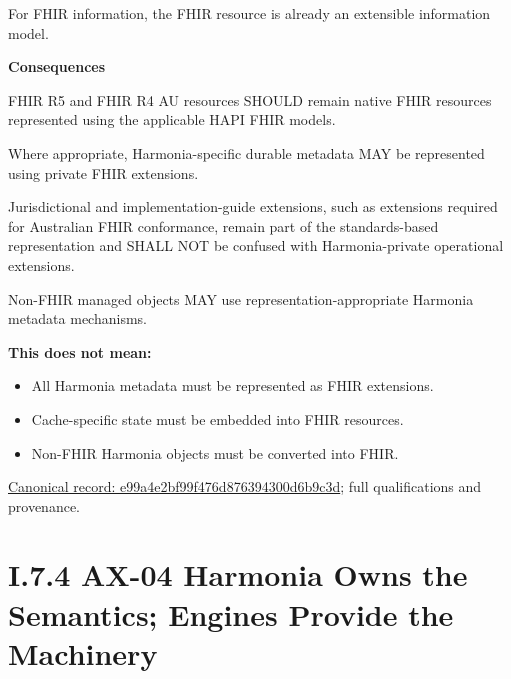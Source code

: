 For FHIR information, the FHIR resource is already an extensible
information model.



\par\medskip\textbf{Consequences}\par


FHIR R5 and FHIR R4 AU resources SHOULD remain native FHIR resources
represented using the applicable HAPI FHIR models.



Where appropriate, Harmonia-specific durable metadata MAY be represented
using private FHIR extensions.



Jurisdictional and implementation-guide extensions, such as extensions
required for Australian FHIR conformance, remain part of the
standards-based representation and SHALL NOT be confused with
Harmonia-private operational extensions.



Non-FHIR managed objects MAY use representation-appropriate Harmonia
metadata mechanisms.



\textbf{This does not mean:}



\begin{itemize}


\item All Harmonia metadata must be represented as FHIR extensions.

\item Cache-specific state must be embedded into FHIR resources.

\item Non-FHIR Harmonia objects must be converted into FHIR.

\end{itemize}

{\footnotesize \href{../../../../continuum/motivation/principle/e99a4e2bf99f476d876394300d6b9c3d.md}{Canonical record: e99a4e2bf99f476d876394300d6b9c3d}; full qualifications and provenance.}\par
\section*{I.7.4 AX-04 Harmonia Owns the Semantics; Engines Provide the Machinery}
\label{navigation:I.7.4}

